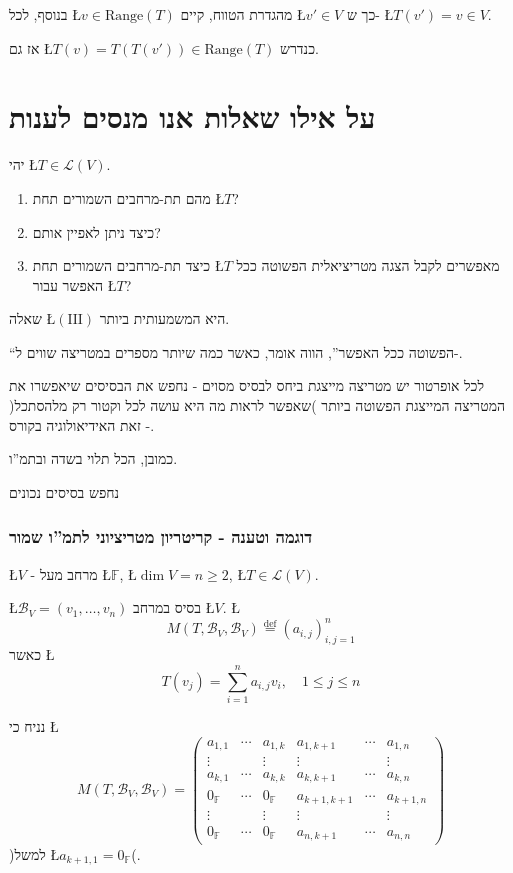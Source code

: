 \documentclass[english,hebrew]{article}
\begin{document}
בנוסף, לכל \L{$v\in\text{Range}(T)$} מהגדרת הטווח, קיים \L{$v'\in V$}
כך ש- \L{$T(v')=v\in V$}.

אז גם \L{$T\left(v\right)=T\left(T\left(v'\right)\right)\in\text{Range}(T)$}
כנדרש.

\part{על אילו שאלות אנו מנסים לענות}

יהי \L{$T\in\mathcal{L}(V)$}.
\begin{enumerate}
\item[)I(] מהם תת-מרחבים השמורים תחת \L{$T$}? 
\item[)II(] כיצד ניתן לאפיין אותם? 
\item[)III(] כיצד תת-מרחבים השמורים תחת \L{$T$} מאפשרים לקבל הצגה מטריציאלית
הפשוטה ככל האפשר עבור \L{$T$}? 
\end{enumerate}
שאלה \L{$\left(\text{III}\right)$} היא המשמעותית ביותר. 

\textquotedblleft הפשוטה ככל האפשר\textquotedblright , הווה אומר,
כאשר כמה שיותר מספרים במטריצה שווים ל-{\endL}.

לכל אופרטור יש מטריצה מייצגת ביחס לבסיס מסוים - נחפש את הבסיסים שיאפשרו
את המטריצה המייצגת הפשוטה ביותר )שאפשר לראות מה היא עושה לכל וקטור
רק מלהסתכל( - זאת האידיאולוגיה בקורס.

כמובן, הכל תלוי בשדה ובתמ\textquotedblright ו. 

נחפש בסיסים נכונים 

\section{דוגמה וטענה - קריטריון מטריציוני לתמ\textquotedblright ו שמור}

\L{$V$} - מרחב מעל \L{$\mathbb{F}$}, \L{$\dim V=n\geq2$}, \L{$T\in\mathcal{L}(V)$}.

\L{$\mathcal{B}_{V}=(v_{1},\dots,v_{n})$} בסיס במרחב \L{$V$}. \L{%
\[
M(T,\mathcal{B}_{V},\mathcal{B}_{V})\overset{\text{def}}{=}(a_{i,j})_{i,j=1}^{n}
\]
}%
כאשר \L{%
\[
T(v_{j})=\sum_{i=1}^{n}a_{i,j}v_{i},\quad1\leq j\leq n
\]
}%

נניח כי \L{%
\[
M(T,\mathcal{B}_{V},\mathcal{B}_{V})=\left(\begin{array}{ccc|ccc}
a_{1,1} & \cdots & a_{1,k} & a_{1,k+1} & \cdots & a_{1,n}\\
\vdots &  & \vdots & \vdots &  & \vdots\\
a_{k,1} & \cdots & a_{k,k} & a_{k,k+1} & \cdots & a_{k,n}\\
\hline 0_{\mathbb{F}} & \cdots & 0_{\mathbb{F}} & a_{k+1,k+1} & \cdots & a_{k+1,n}\\
\vdots &  & \vdots & \vdots &  & \vdots\\
0_{\mathbb{F}} & \cdots & 0_{\mathbb{F}} & a_{n,k+1} & \cdots & a_{n,n}
\end{array}\right)
\]
}%
)למשל \L{$a_{k+1,1}=0_{\mathbb{F}}$}(.
\end{document}
